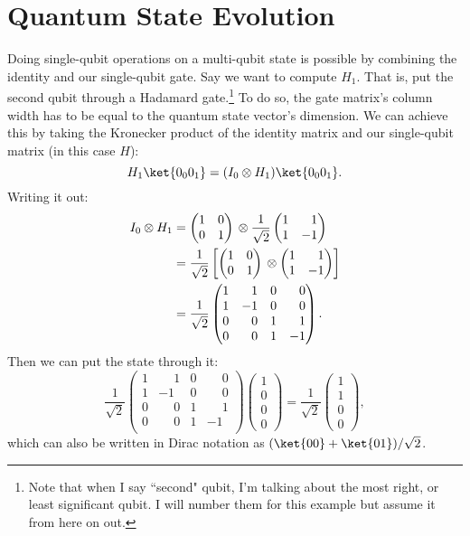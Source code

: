 \section{Quantum State Evolution}
Doing single-qubit operations on a multi-qubit state is possible by combining the identity and our single-qubit gate. Say we want to compute $H_1$. That is, put the second qubit through a Hadamard gate.\footnote{Note that when I say ``second" qubit, I'm talking about the most right, or least significant qubit. I will number them for this example but assume it from here on out.} To do so, the gate matrix's column width has to be equal to the quantum state vector's dimension. We can achieve this by taking the Kronecker product of the identity matrix and our single-qubit matrix (in this case $H$):
\begin{equation}
  H_1\ket{0_0 0_1} = (I_0 \otimes H_1)\ket{0_0 0_1}.
\end{equation}
Writing it out:
\begin{align}
  I_0 \otimes H_1 &=
  \igate{} \otimes \hgate{} \\
  &=
  \dfrac{1}{\sqrt2}
  \left[
    \igate{}
    \otimes
    \begin{pmatrix}
      1 & \phantom{-}1 \\
      1 & -1
    \end{pmatrix}
  \right] \\
&= \dfrac{1}{\sqrt2}
  \begin{pmatrix}
    1 & \phantom{-}1 & 0 & \phantom{-}0 \\
    1 & -1 & 0 & \phantom{-}0 \\
    0 & \phantom{-}0 & 1 & \phantom{-}1 \\
    0 & \phantom{-}0 & 1 & -1 \\
  \end{pmatrix}.
\end{align}
Then we can put the  state through it:
\begin{equation}
  \dfrac{1}{\sqrt2}
  \begin{pmatrix}
    1 & \phantom{-}1 & 0 & \phantom{-}0 \\
    1 & -1 & 0 & \phantom{-}0 \\
    0 & \phantom{-}0 & 1 & \phantom{-}1 \\
    0 & \phantom{-}0 & 1 & -1 \\
  \end{pmatrix}
  \begin{pmatrix}
    1 \\
    0 \\
    0 \\
    0
  \end{pmatrix}
  =
  \dfrac{1}{\sqrt2}
  \begin{pmatrix}
    1 \\
    1 \\
    0 \\
    0
  \end{pmatrix},
\end{equation}
which can also be written in Dirac notation as $(\ket{00} + \ket{01})/\sqrt2$.


